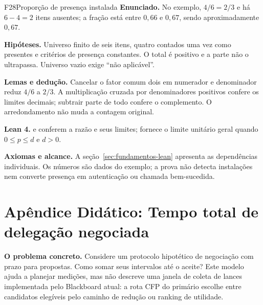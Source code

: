 \clearpage
\begin{formalizacao}{F28}{Proporção de presença instalada}
\textbf{Enunciado.} No exemplo, $4/6=2/3$ e há $6-4=2$ itens ausentes;
a fração está entre $0{,}66$ e $0{,}67$, sendo aproximadamente $0{,}67$.

\textbf{Hipóteses.} Universo finito de seis itens, quatro contados uma vez
como presentes e critérios de presença constantes. O total é positivo e
a parte não o ultrapassa. Universo vazio exige ``não aplicável''.

\textbf{Lemas e dedução.} Cancelar o fator comum dois em numerador e
denominador reduz $4/6$ a $2/3$. A multiplicação cruzada por denominadores
positivos confere os limites decimais; subtrair parte de todo confere o
complemento. O arredondamento não muda a contagem original.

\textbf{Lean 4.}  e
 conferem a razão e seus limites;
 fornece o limite unitário
geral quando $0\leq p\leq d$ e $d>0$.

\textbf{Axiomas e alcance.} A seção~\ref{sec:fundamentos-lean} apresenta
as dependências individuais. Os números são dados do exemplo; a prova
não detecta instalações nem converte presença em autenticação ou chamada
bem-sucedida.
\end{formalizacao}

\clearpage

\section{Apêndice Didático: Tempo total de delegação negociada}


\begin{descricao}
\textbf{O problema concreto.} Considere um protocolo hipotético de negociação com prazo para propostas. Como somar seus intervalos até o aceite? Este modelo ajuda a planejar medições, mas não descreve uma janela de coleta de lances implementada pelo Blackboard atual: a rota CFP do primário escolhe entre candidatos elegíveis pelo caminho de redução ou ranking de utilidade.
\end{descricao}

